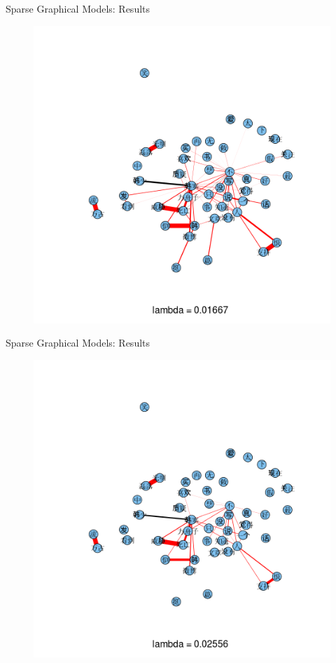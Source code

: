 \documentclass[12pt]{beamer}
\newcommand{\1}[1]{{\mathbf 1}\left\{#1\right\}}        %
\begin{document}
\begin{frame}{Sparse Graphical Models: Results}

\begin{figure}
  \centering
  \includegraphics[height=0.9\textheight]{./../../gLassoResults/glasso4.png} 
\end{figure}

\end{frame}
\begin{frame}{Sparse Graphical Models: Results}

\begin{figure}
  \centering
  \includegraphics[height=0.9\textheight]{./../../gLassoResults/glasso5.png} 
\end{figure}

\end{frame}
\end{document}
